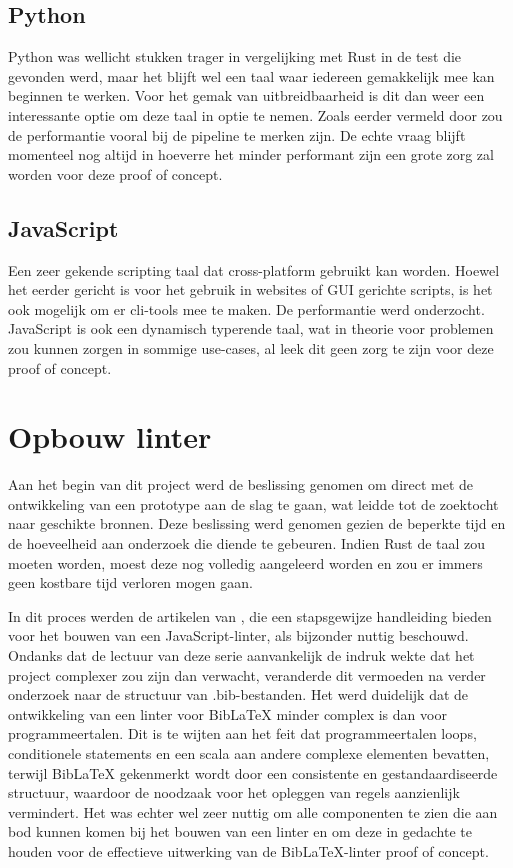 \subsection{Python}
Python was wellicht stukken trager in vergelijking met Rust in de test die gevonden werd, maar het blijft wel een taal waar iedereen gemakkelijk mee kan beginnen te werken. Voor het gemak van uitbreidbaarheid is dit dan weer een interessante optie om deze taal in optie te nemen. Zoals eerder vermeld door \textcite{TurnerTrauring2023} zou de performantie vooral bij de pipeline te merken zijn.
De echte vraag blijft momenteel nog altijd in hoeverre het minder performant zijn een grote zorg zal worden voor deze proof of concept.

\subsection{JavaScript}
Een zeer gekende scripting taal dat cross-platform gebruikt kan worden. Hoewel het eerder gericht is voor het gebruik in websites of GUI gerichte scripts, is het ook mogelijk om er cli-tools mee te maken. De performantie werd onderzocht. JavaScript is ook een dynamisch typerende taal, wat in theorie voor problemen zou kunnen zorgen in sommige use-cases, al leek dit geen zorg te zijn voor deze proof of concept\autocite{Simpson2023}.

\section{Opbouw linter}
Aan het begin van dit project werd de beslissing genomen om direct met de ontwikkeling van een prototype aan de slag te gaan, wat leidde tot de zoektocht naar geschikte bronnen. Deze beslissing werd genomen gezien de beperkte tijd en de hoeveelheid aan onderzoek die diende te gebeuren. Indien Rust de taal zou moeten worden, moest deze nog volledig aangeleerd worden en zou er immers geen kostbare tijd verloren mogen gaan.

In dit proces werden de artikelen van \textcite{BorgesLate2021}, die een stapsgewijze handleiding bieden voor het bouwen van een JavaScript-linter, als bijzonder nuttig beschouwd. Ondanks dat de lectuur van deze serie aanvankelijk de indruk wekte dat het project complexer zou zijn dan verwacht, veranderde dit vermoeden na verder onderzoek naar de structuur van .bib-bestanden. Het werd duidelijk dat de ontwikkeling van een linter voor BibLaTeX minder complex is dan voor programmeertalen. Dit is te wijten aan het feit dat programmeertalen loops, conditionele statements en een scala aan andere complexe elementen bevatten, terwijl BibLaTeX gekenmerkt wordt door een consistente en gestandaardiseerde structuur, waardoor de noodzaak voor het opleggen van regels aanzienlijk vermindert. Het was echter wel zeer nuttig om alle componenten te zien die aan bod kunnen komen bij het bouwen van een linter en om deze in gedachte te houden voor de effectieve uitwerking van de BibLaTeX-linter proof of concept.

